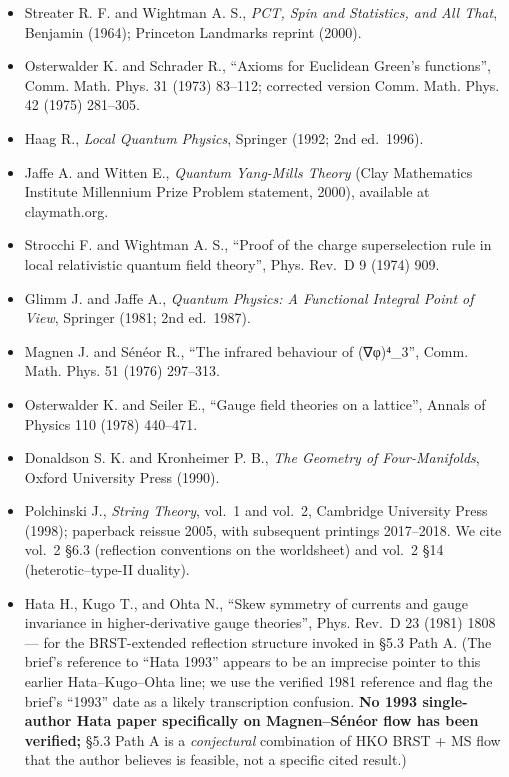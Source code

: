 \documentclass[
 11pt,
 a4paper,
]{article}
\providecommand{\tightlist}{\setlength{\itemsep}{0pt}\setlength{\parskip}{0pt}}
\providecommand{\tightlist}{%
 \setlength{\itemsep}{0pt}\setlength{\parskip}{0pt}}
\begin{document}
\begin{itemize}
\tightlist
\item
 Streater R. F. and Wightman A. S., \emph{PCT, Spin and Statistics, and All That}, Benjamin (1964); Princeton Landmarks reprint (2000).
\item
 Osterwalder K. and Schrader R., ``Axioms for Euclidean Green's functions'', Comm. Math. Phys. 31 (1973) 83--112; corrected version Comm. Math. Phys. 42 (1975) 281--305.
\item
 Haag R., \emph{Local Quantum Physics}, Springer (1992; 2nd ed.~1996).
\item
 Jaffe A. and Witten E., \emph{Quantum Yang-Mills Theory} (Clay Mathematics Institute Millennium Prize Problem statement, 2000), available at claymath.org.
\item
 Strocchi F. and Wightman A. S., ``Proof of the charge superselection rule in local relativistic quantum field theory'', Phys. Rev.~D 9 (1974) 909.
\item
 Glimm J. and Jaffe A., \emph{Quantum Physics: A Functional Integral Point of View}, Springer (1981; 2nd ed.~1987).
\item
 Magnen J. and Sénéor R., ``The infrared behaviour of (∇φ)⁴\_3'', Comm. Math. Phys. 51 (1976) 297--313.
\item
 Osterwalder K. and Seiler E., ``Gauge field theories on a lattice'', Annals of Physics 110 (1978) 440--471.
\item
 Donaldson S. K. and Kronheimer P. B., \emph{The Geometry of Four-Manifolds}, Oxford University Press (1990).
\item
 Polchinski J., \emph{String Theory}, vol.~1 and vol.~2, Cambridge University Press (1998); paperback reissue 2005, with subsequent printings 2017--2018. We cite vol.~2 §6.3 (reflection conventions on the worldsheet) and vol.~2 §14 (heterotic--type-II duality).
\item
 Hata H., Kugo T., and Ohta N., ``Skew symmetry of currents and gauge invariance in higher-derivative gauge theories'', Phys. Rev.~D 23 (1981) 1808 --- for the BRST-extended reflection structure invoked in §5.3 Path A. (The brief's reference to ``Hata 1993'' appears to be an imprecise pointer to this earlier Hata--Kugo--Ohta line; we use the verified 1981 reference and flag the brief's ``1993'' date as a likely transcription confusion. \textbf{No 1993 single-author Hata paper specifically on Magnen--Sénéor flow has been verified;} §5.3 Path A is a \emph{conjectural} combination of HKO BRST + MS flow that the author believes is feasible, not a specific cited result.)

\end{itemize}
\end{document}
